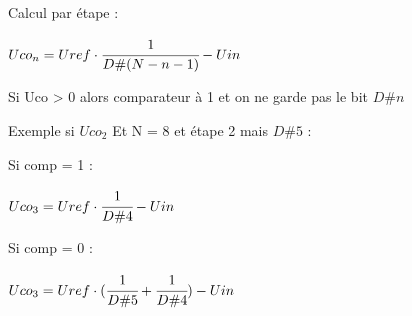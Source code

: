 \hformbar



Calcul par étape : 

$Uco_n = Uref \cdot \cfrac{1}{D\#(N-n-1)} - Uin$

Si Uco > 0 alors comparateur à 1 et on ne garde pas le bit $D\#n$

Exemple si $Uco_2$ Et N = 8 et étape 2 mais $D\#5$ :

Si comp = 1 : 

$Uco_3 = Uref \cdot \cfrac{1}{D\#4} - Uin$

Si comp = 0 : 

$Uco_3 = Uref \cdot (\cfrac{1}{D\#5} + \cfrac{1}{D\#4}) - Uin$